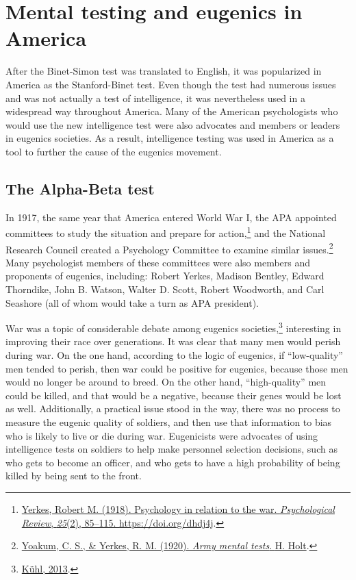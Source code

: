\documentclass[
  oneside,
  12pt]{crumpbook}
\begin{document}
\hypertarget{mental-testing-and-eugenics-in-america}{%
\section{Mental testing and eugenics in America}\label{mental-testing-and-eugenics-in-america}}

After the Binet-Simon test was translated to English, it was popularized in America as the Stanford-Binet test. Even though the test had numerous issues and was not actually a test of intelligence, it was nevertheless used in a widespread way throughout America. Many of the American psychologists who would use the new intelligence test were also advocates and members or leaders in eugenics societies. As a result, intelligence testing was used in America as a tool to further the cause of the eugenics movement.

\hypertarget{the-alpha-beta-test}{%
\subsection{The Alpha-Beta test}\label{the-alpha-beta-test}}

In 1917, the same year that America entered World War I, the APA appointed committees to study the situation and prepare for action,\footnote{\protect\hyperlink{ref-yerkesPsychologyRelationWar1918}{Yerkes, Robert M. (1918). Psychology in relation to the war. \emph{Psychological Review}, \emph{25}(2), 85--115. \url{https://doi.org/dhdj4j}}.} and the National Research Council created a Psychology Committee to examine similar issues.\footnote{\protect\hyperlink{ref-yoakumArmyMentalTests1920}{Yoakum, C. S., \& Yerkes, R. M. (1920). \emph{Army mental tests}. {H. Holt}}.} Many psychologist members of these committees were also members and proponents of eugenics, including: Robert Yerkes, Madison Bentley, Edward Thorndike, John B. Watson, Walter D. Scott, Robert Woodworth, and Carl Seashore (all of whom would take a turn as APA president).

War was a topic of considerable debate among eugenics societies,\footnote{\protect\hyperlink{ref-kuhlBettermentRaceRise2013}{Kühl, 2013}.} interesting in improving their race over generations. It was clear that many men would perish during war. On the one hand, according to the logic of eugenics, if ``low-quality'' men tended to perish, then war could be positive for eugenics, because those men would no longer be around to breed. On the other hand, ``high-quality'' men could be killed, and that would be a negative, because their genes would be lost as well. Additionally, a practical issue stood in the way, there was no process to measure the eugenic quality of soldiers, and then use that information to bias who is likely to live or die during war. Eugenicists were advocates of using intelligence tests on soldiers to help make personnel selection decisions, such as who gets to become an officer, and who gets to have a high probability of being killed by being sent to the front.
\end{document}
